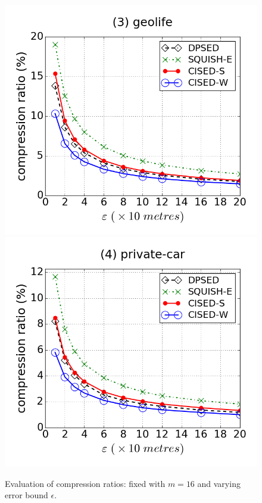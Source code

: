 \begin{figure}[tb!]
\includegraphics[scale = 0.250]{figures/Exp-cr-epsilon-geolife.png}
\includegraphics[scale = 0.250]{figures/Exp-cr-epsilon-private.png}
\vspace{-2ex}
\caption{\small Evaluation of compression ratios: fixed with $m=16$ and varying error bound $\epsilon$.}
\label{fig:cr-m16}
\vspace{-2.0ex}
\end{figure}


